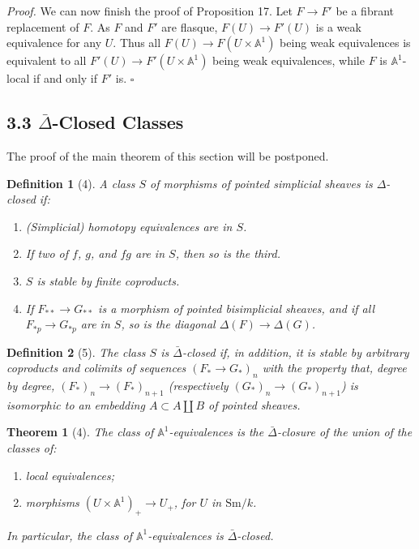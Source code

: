 \documentclass[11pt]{article}
\newcommand{\Aone}{\mathbb A^1}
\newcommand{\Sm}{\mathrm{Sm}}
\theoremstyle{deligne}
\newtheorem*{theorem*}{Theorem}
\newtheorem*{definition*}{Definition}
\newenvironment{proofdel}{\noindent\textit{Proof.}}{\hfill$\square$}
\begin{document}
\begin{proofdel}
We can now finish the proof of Proposition 17. Let \(F\to F'\) be a fibrant replacement of \(F\). As \(F\) and \(F'\) are flasque, \(F(U)\to F'(U)\) is a weak equivalence for any \(U\). Thus all \(F(U)\to F(U\times\Aone)\) being weak equivalences is equivalent to all \(F'(U)\to F'(U\times\Aone)\) being weak equivalences, while \(F\) is \(\Aone\)-local if and only if \(F'\) is.
\end{proofdel}

\subsection*{3.3 \(\bar\Delta\)-Closed Classes}

The proof of the main theorem of this section will be postponed.

\begin{definition*}[4]
A class \(S\) of morphisms of pointed simplicial sheaves is \(\Delta\)-closed if:
\begin{enumerate}[label=\arabic*.]
\item (Simplicial) homotopy equivalences are in \(S\).
\item If two of \(f\), \(g\), and \(fg\) are in \(S\), then so is the third.
\item \(S\) is stable by finite coproducts.
\item If \(F_{**}\to G_{**}\) is a morphism of pointed bisimplicial sheaves, and if all \(F_{*p}\to G_{*p}\) are in \(S\), so is the diagonal \(\Delta(F)\to\Delta(G)\).
\end{enumerate}
\end{definition*}

\begin{definition*}[5]
The class \(S\) is \(\bar\Delta\)-closed if, in addition, it is stable by arbitrary coproducts and colimits of sequences \((F_*\to G_*)_n\) with the property that, degree by degree, \((F_*)_n\to(F_*)_{n+1}\) (respectively \((G_*)_n\to(G_*)_{n+1}\)) is isomorphic to an embedding \(A\subset A\coprod B\) of pointed sheaves.
\end{definition*}

\begin{theorem*}[4]
The class of \(\Aone\)-equivalences is the \(\bar\Delta\)-closure of the union of the classes of:
\begin{enumerate}[label=\arabic*.]
\item local equivalences;
\item morphisms \((U\times\Aone)_+\to U_+\), for \(U\) in \(\Sm/k\).
\end{enumerate}
In particular, the class of \(\Aone\)-equivalences is \(\bar\Delta\)-closed.
\end{theorem*}
\end{document}
